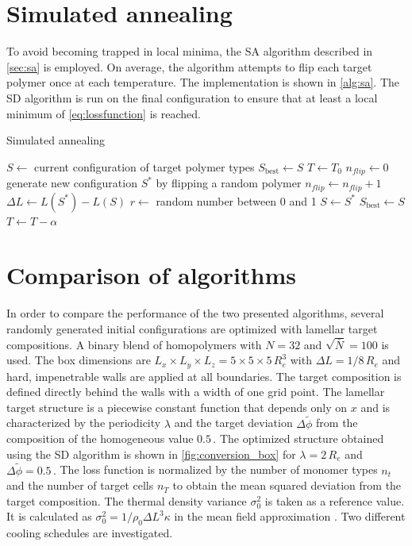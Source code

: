 \documentclass[bachelor,       %
               oneside,        %
               BCOR10mm,       %
               ngerman, english %
               ]{GAUBM}
\begin{document}
\section{Simulated annealing}

To avoid becoming trapped in local minima, the \ac{SA} algorithm described in \autoref{sec:sa} is employed. On average, the algorithm attempts to flip each target polymer once at each temperature. The implementation is shown in \autoref{alg:sa}. The \ac{SD} algorithm is run on the final configuration to ensure that at least a local minimum of \autoref{eq:lossfunction} is reached.

\begin{algorithm}[H]
\caption{Simulated annealing}\label{alg:sa}
\begin{algorithmic}[1]
\State $S \gets$ current configuration of target polymer types
\State $S_\text{best}\gets S$
\State $T \gets T_0$
    \State $n_{flip} \gets 0$
        \State generate new configuration $S^*$ by flipping a random polymer
        \State $n_{flip}\gets n_{flip}+1$
        \State $\Delta L\gets L(S^*)-L(S)$
        \State $r\gets$ random number between 0 and 1
            \State $S\gets S^*$
        \EndIf
    \EndWhile
{}
    \State $S_\text{best}\gets S$ 
\EndIf
\State $T\gets T-\alpha$ 
\EndWhile
\end{algorithmic}
\end{algorithm}

\section{Comparison of algorithms}


In order to compare the performance of the two presented algorithms, several randomly generated initial configurations are optimized with lamellar target compositions. A binary blend of homopolymers with $N=32$ and $\sqrt{\bar N}=100$ is used. The box dimensions are $L_x\times L_y\times L_z=5\times5\times5\,R_e^3$ with $\Delta L=1/8\,R_e$ and hard, impenetrable walls are applied at all boundaries. The target composition is defined directly behind the walls with a width of one grid point. The lamellar target structure is a piecewise constant function that depends only on $x$ and is characterized by the periodicity $\lambda$ and the target deviation $\Delta\tilde\phi$ from the composition of the homogeneous value $0.5\,.$  The optimized structure obtained using the \ac{SD} algorithm is shown in \autoref{fig:conversion_box} for $\lambda=2\,R_e$ and $\Delta\tilde\phi=0.5\,.$ The loss function is normalized by the number of monomer types $n_t$ and the number of target cells $n_T$ to obtain the mean squared deviation from the target composition. The thermal density variance $\sigma_0^2$ is taken as a reference value. It is calculated as $\sigma_0^2=1/\rho_0\Delta L^3\kappa$ in the mean field approximation \cite{Daoulas06}. Two different cooling schedules are investigated.
\end{document}
